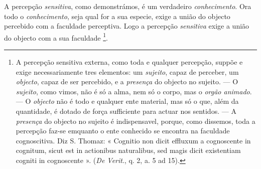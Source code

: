 
A percepção \emph{sensitiva}, como demonstrámos, é um verdadeiro \emph{conhecimento}. Ora todo o \emph{conhecimento}, seja qual for a sua especie, exige a união do objecto percebido com a faculdade perceptiva. Logo a percepção \emph{sensitiva} exige a união do objecto com a sua faculdade \footnote{A percepção sensitiva externa, como toda e qualquer percepção, suppõe e exige necessariamente tres elementos: um \emph{sujeito}, capaz de perceber, um \emph{objecto}, capaz de ser percebido, e a \emph{presença} do objecto no sujeito. --- O \emph{sujeito}, como vimos, não é só a alma, nem só o corpo, mas o \emph{orgão animado}. --- O \emph{objecto} não é todo e qualquer ente material, mas só o que, além da quantidade, é dotado de força sufficiente para actuar nos sentidos. --- A \emph{presença} do objecto no sujeito é indispensavel, porque, como dissemos, toda a percepção faz-se emquanto o ente conhecido se encontra na faculdade cognoscitiva. Diz S. Thomaz: « Cognitio non dicit effluxum a cognoscente in cognitum, sicut est in actionibus naturalibus, sed magis dicit existentiam cogniti in cognoscente ». (\emph{De Verit}., q. 2, a. 5 ad 15).}.


